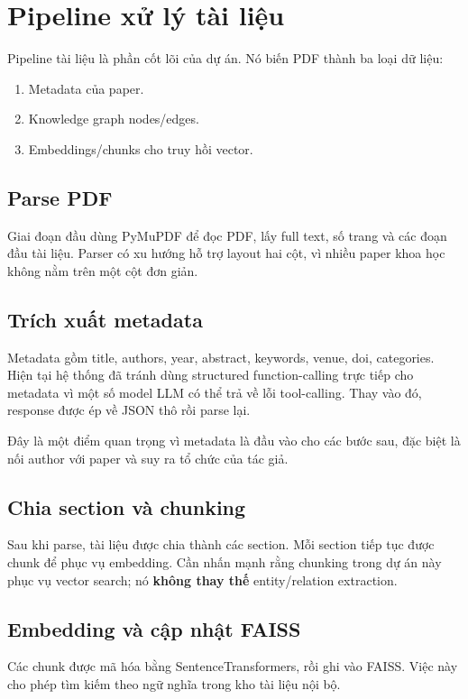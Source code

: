 \documentclass[12pt,a4paper]{article}
\begin{document}
\section{Pipeline xử lý tài liệu}
Pipeline tài liệu là phần cốt lõi của dự án. Nó biến PDF thành ba loại dữ liệu:
\begin{enumerate}[leftmargin=1.6em]
  \item Metadata của paper.
  \item Knowledge graph nodes/edges.
  \item Embeddings/chunks cho truy hồi vector.
\end{enumerate}

\subsection{Parse PDF}
Giai đoạn đầu dùng PyMuPDF để đọc PDF, lấy full text, số trang và các đoạn đầu tài liệu. Parser có xu hướng hỗ trợ layout hai cột, vì nhiều paper khoa học không nằm trên một cột đơn giản.

\subsection{Trích xuất metadata}
Metadata gồm title, authors, year, abstract, keywords, venue, doi, categories. Hiện tại hệ thống đã tránh dùng structured function-calling trực tiếp cho metadata vì một số model LLM có thể trả về lỗi tool-calling. Thay vào đó, response được ép về JSON thô rồi parse lại.

Đây là một điểm quan trọng vì metadata là đầu vào cho các bước sau, đặc biệt là nối author với paper và suy ra tổ chức của tác giả.

\subsection{Chia section và chunking}
Sau khi parse, tài liệu được chia thành các section. Mỗi section tiếp tục được chunk để phục vụ embedding. Cần nhấn mạnh rằng chunking trong dự án này phục vụ vector search; nó \textbf{không thay thế} entity/relation extraction.

\subsection{Embedding và cập nhật FAISS}
Các chunk được mã hóa bằng SentenceTransformers, rồi ghi vào FAISS. Việc này cho phép tìm kiếm theo ngữ nghĩa trong kho tài liệu nội bộ.
\end{document}

